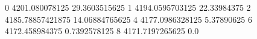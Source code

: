 0 4201.080078125 29.3603515625
1 4194.0595703125 22.33984375
2 4185.78857421875 14.06884765625
4 4177.0986328125 5.37890625
6 4172.458984375 0.7392578125
8 4171.7197265625 0.0
